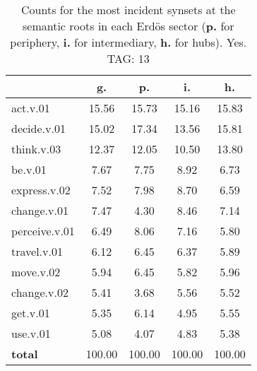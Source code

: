 \begin{table}[h!]
\begin{center}
\begin{tabular}{| l || c | c | c | c |}\hline
 & {\bf g.} & {\bf p.} & {\bf i.} & {\bf h.} \\\hline\hline
act.v.01 & 15.56  & 15.73  & 15.16  & 15.83 \\\hline
decide.v.01 & 15.02  & 17.34  & 13.56  & 15.81 \\\hline
think.v.03 & 12.37  & 12.05  & 10.50  & 13.80 \\\hline
be.v.01 & 7.67  & 7.75  & 8.92  & 6.73 \\\hline
express.v.02 & 7.52  & 7.98  & 8.70  & 6.59 \\\hline
change.v.01 & 7.47  & 4.30  & 8.46  & 7.14 \\\hline
perceive.v.01 & 6.49  & 8.06  & 7.16  & 5.80 \\\hline
travel.v.01 & 6.12  & 6.45  & 6.37  & 5.89 \\\hline
move.v.02 & 5.94  & 6.45  & 5.82  & 5.96 \\\hline
change.v.02 & 5.41  & 3.68  & 5.56  & 5.52 \\\hline
get.v.01 & 5.35  & 6.14  & 4.95  & 5.55 \\\hline
use.v.01 & 5.08  & 4.07  & 4.83  & 5.38 \\\hline\hline
{{\bf total}} & 100.00  & 100.00  & 100.00  & 100.00 \\\hline
\end{tabular}
\caption{Counts for the most incident synsets at the semantic roots in each Erd\"os sector ({\bf p.} for periphery, {\bf i.} for intermediary, {\bf h.} for hubs). Yes. TAG: 13}
\end{center}
\end{table}
